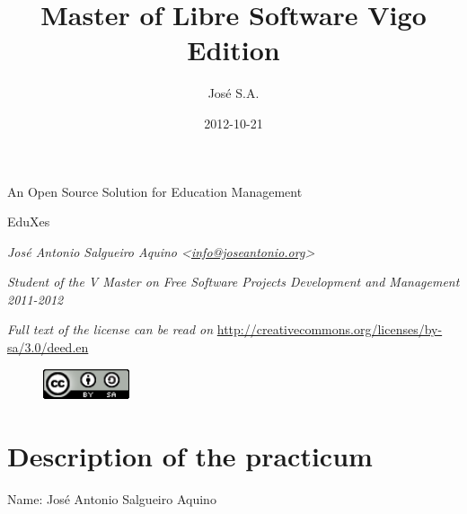 \documentclass[a4paper]{article}
\title{Master of Libre Software Vigo Edition}
\author{José S.A.}
\date{2012-10-21}
\begin{document}
\clearpage\setcounter{page}{1}\pagestyle{Standard}
\thispagestyle{FirstPage}

\bigskip


\bigskip

{\centering
An Open Source Solution for Education Management
\par}

{\centering
EduXes
\par}


\bigskip


\bigskip


\bigskip


\bigskip


\bigskip

{\centering
\textit{José Antonio Salgueiro Aquino
{\textless}}\href{mailto:info@joseantonio.org}{\textit{info@joseantonio.org}}\textit{{\textgreater}
}
\par}

{\centering
\textit{Student of the V Master on Free Software Projects Development
and Management 2011-2012}
\par}


\textit{Full text of the license can be read on
}\url{http://creativecommons.org/licenses/by-sa/3.0/deed.en}

{\centering \par}

\begin{figure}
\centering
\includegraphics[width=2.528cm,height=0.891cm]{PhoneGapProjectMSWLMemory-img/PhoneGapProjectMSWLMemory-img1.png}
\end{figure}
\setcounter{tocdepth}{10}
\renewcommand\contentsname{Contents}
\tableofcontents

\bigskip

\clearpage\section[Description of the practicum ]{Description of the
practicum }
\hypertarget{RefHeading114141570052158}{}Name: José Antonio Salgueiro
Aquino
\end{document}
